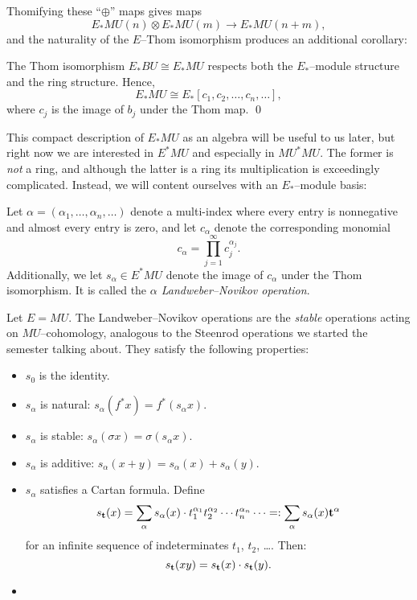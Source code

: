 Thomifying these ``$\oplus$'' maps gives maps \[E_* MU(n) \otimes E_* MU(m) \to E_* MU(n+m),\] and the naturality of the $E$--Thom isomorphism produces an additional corollary:
\begin{corollary}
The Thom isomorphism $E_* BU \cong E_* MU$ respects both the $E_*$--module structure and the ring structure.  Hence, \[E_* MU \cong E_*[c_1, c_2, \ldots, c_n, \ldots],\] where $c_j$ is the image of $b_j$ under the Thom map. \qed
\end{corollary}

\noindent This compact description of $E_* MU$ as an algebra will be useful to us later, but right now we are interested in $E^* MU$ and especially in $MU^* MU$.  The former is \emph{not} a ring, and although the latter is a ring its multiplication is exceedingly complicated.  Instead, we will content ourselves with an $E_*$--module basis:
\begin{definition}
Let $\alpha = (\alpha_1, \ldots, \alpha_n, \ldots)$ denote a multi-index where every entry is nonnegative and almost every entry is zero, and let $c_\alpha$ denote the corresponding monomial \[c_\alpha = \prod_{j=1}^\infty c_j^{\alpha_j}.\]  Additionally, we let $s_\alpha \in E^* MU$ denote the image of $c_\alpha$ under the Thom isomorphism.  It is called the \textit{$\alpha${\th} Landweber--Novikov operation}.
\end{definition}

\begin{remark}
Let $E = MU$.  The Landweber--Novikov operations are the \emph{stable} operations acting on $MU$--cohomology, analogous to the Steenrod operations we started the semester talking about.  They satisfy the following properties:
\begin{itemize}
\item $s_0$ is the identity.
\item $s_\alpha$ is natural: $s_\alpha(f^* x) = f^*(s_\alpha x)$.
\item $s_\alpha$ is stable: $s_\alpha(\sigma x) = \sigma(s_\alpha x)$.
\item $s_\alpha$ is additive: $s_\alpha(x + y) = s_\alpha(x) + s_\alpha(y)$.
\item $s_\alpha$ satisfies a Cartan formula.  Define \[s_{\mathbf t}(x) = \sum_\alpha s_\alpha(x) \cdot t_1^{\alpha_1} t_2^{\alpha_2} \cdots t_n^{\alpha_n} \cdots =: \sum_{\alpha} s_\alpha(x) \mathbf t^\alpha\] for an infinite sequence of indeterminates $t_1$, $t_2$, \ldots.  Then: \[s_{\mathbf t}(x y) = s_{\mathbf t}(x) \cdot s_{\mathbf t}(y).\]
\item {}
\end{itemize}
\end{remark}

